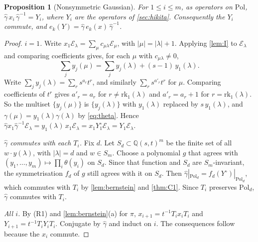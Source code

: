\documentclass[11pt]{amsart}
\newtheorem{proposition}[theorem]{Proposition}
\theoremstyle{definition}
\theoremstyle{remark}
\numberwithin{equation}{section}
\begin{document}
\begin{proposition}[Nonsymmetric Gaussian]\label{prop:NS}
For $1\le i\le m$, as operators on $\mathrm{Pol}$, $\widehat\gamma\,x_i\,\widehat\gamma^{-1}=Y_i$, where $Y_i$ are the operators of \cref{sec:hikita}. Consequently the $Y_i$ commute, and $e_k(Y)=\widehat\gamma\,e_k(x)\,\widehat\gamma^{-1}$.
\end{proposition}
\begin{proof}
\emph{$i=1$.} Write $x_1\mathcal E_\lambda=\sum_\mu c_{\mu\lambda}\mathcal E_\mu$, with $|\mu|=|\lambda|+1$. Applying \cref{lem:I} to $\mathcal E_\lambda$ and comparing coefficients gives, for each $\mu$ with $c_{\mu\lambda}\ne0$,
\[ \textstyle\sum_jy_j(\mu)=\sum_jy_j(\lambda)+(s-1)\,y_1(\lambda). \]
Write $\sum_jy_j(\lambda)=\sum_rs^{a_r}t^r$, and similarly $\sum_rs^{a'_r}t^r$ for $\mu$. Comparing coefficients of $t^r$ gives $a'_r=a_r$ for $r\ne\mathrm{rk}_1(\lambda)$ and $a'_r=a_r+1$ for $r=\mathrm{rk}_1(\lambda)$. So the multiset $\{y_j(\mu)\}$ is $\{y_j(\lambda)\}$ with $y_1(\lambda)$ replaced by $s\,y_1(\lambda)$, and $\gamma(\mu)=y_1(\lambda)\gamma(\lambda)$ by \eqref{eq:theta}. Hence $\widehat\gamma x_1\widehat\gamma^{-1}\mathcal E_\lambda=y_1(\lambda)\,x_1\mathcal E_\lambda=x_1Y^\circ_1\mathcal E_\lambda=Y_1\mathcal E_\lambda$.

\emph{$\widehat\gamma$ commutes with each $T_i$.} Fix $d$. Let $S_d\subset\mathbb{Q}(s,t)^m$ be the finite set of all $w\cdot y(\lambda)$, with $|\lambda|=d$ and $w\in S_m$. Choose a polynomial $g$ that agrees with $(y_1,\dots,y_m)\mapsto\prod_i\theta(y_i)$ on $S_d$. Since that function and $S_d$ are $S_m$-invariant, the symmetrisation $f_d$ of $g$ still agrees with it on $S_d$. Then $\widehat\gamma|_{\mathrm{Pol}_d}=f_d(Y^\circ)|_{\mathrm{Pol}_d}$, which commutes with $T_i$ by \cref{lem:bernstein} and \cref{thm:C1}. Since $T_i$ preserves $\mathrm{Pol}_d$, $\widehat\gamma$ commutes with $T_i$.

\emph{All $i$.} By (R1) and \cref{lem:bernstein}(a) for $\pi$, $x_{i+1}=t^{-1}T_ix_iT_i$ and $Y_{i+1}=t^{-1}T_iY_iT_i$. Conjugate by $\widehat\gamma$ and induct on $i$. The consequences follow because the $x_i$ commute.
\end{proof}
\end{document}

